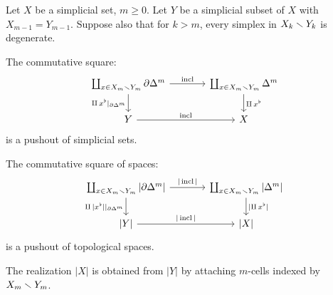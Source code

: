 \begin{proposition}\label{proposition:cw-structure-on-realization-preparation}
Let $X$ be a simplicial set, $m\ge0$. Let $Y$ be a simplicial subset of $X$ with $X_{m-1}=Y_{m-1}$. Suppose also that for $k>m$, every simplex in $X_k\smallsetminus Y_k$ is degenerate.
\begin{numerate}
\item The commutative square:
\[
\begin{tikzcd}[column sep=large]
\coprod_{x\in X_m\sm Y_m}\de\Delta^m \ar[d,"\amalg\,x^\flat|_{\de\Delta^m}"'] \ar[r,"\incl"] & \coprod_{x\in X_m\sm Y_m}\Delta^m \ar[d,"\amalg\,x^\flat"]\\
Y \ar[r,"\incl"] & X
\end{tikzcd}
\]
is a pushout of simplicial sets.
\item The commutative square of spaces:
\[
\begin{tikzcd}[column sep=large]
\coprod_{x\in X_m\sm Y_m}|\de\Delta^m| \ar[d,"\amalg\,|x^\flat||_{\de\Delta^m}"'] \ar[r,"|\incl|"] & \coprod_{x\in X_m\sm Y_m}|\Delta^m| \ar[d,"|\amalg\,x^\flat|"]\\
{|Y|} \ar[r,"|\incl|"] & {|X|}
\end{tikzcd}
\]
is a pushout of topological spaces.
\item The realization $|X|$ is obtained from $|Y|$ by attaching $m$-cells indexed by $X_m\smallsetminus Y_m$.
\end{numerate}
\end{proposition}


